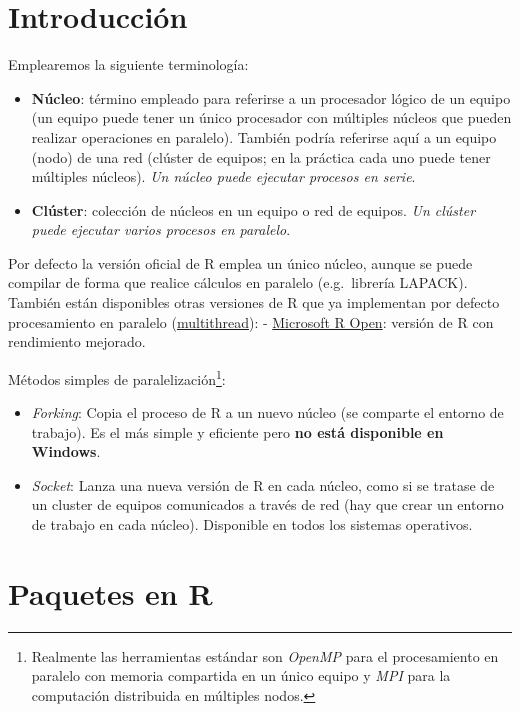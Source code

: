\documentclass[
  10pt,
]{book}
\theoremstyle{break}
\theoremstyle{nonumberplain}
\let\oldfootnote\footnote
\renewcommand\footnote[1]{\oldfootnote{\hspace{2mm}#1}}
\begin{document}
\hypertarget{introducciuxf3n}{%
\section{Introducción}\label{introducciuxf3n}}

Emplearemos la siguiente terminología:

\begin{itemize}
\item
  \textbf{Núcleo}: término empleado para referirse a un procesador lógico de un equipo (un equipo puede tener un único procesador con múltiples núcleos que pueden realizar operaciones en paralelo).
  También podría referirse aquí a un equipo (nodo) de una red (clúster de equipos; en la práctica cada uno puede tener múltiples núcleos). \emph{Un núcleo puede ejecutar procesos en serie}.
\item
  \textbf{Clúster}: colección de núcleos en un equipo o red de equipos.
  \emph{Un clúster puede ejecutar varios procesos en paralelo}.
\end{itemize}

Por defecto la versión oficial de R emplea un único núcleo, aunque se puede compilar de forma que realice cálculos en paralelo (e.g.~librería LAPACK).
También están disponibles otras versiones de R que ya implementan por defecto procesamiento en paralelo (\href{https://mran.revolutionanalytics.com/documents/rro/multithread}{multithread}):
- \href{https://mran.revolutionanalytics.com}{Microsoft R Open}: versión de R con rendimiento mejorado.

Métodos simples de paralelización\footnote{Realmente las herramientas estándar son \emph{OpenMP} para el procesamiento en paralelo con memoria compartida en un único equipo y \emph{MPI} para la computación distribuida en múltiples nodos.}:

\begin{itemize}
\item
  \emph{Forking}: Copia el proceso de R a un nuevo núcleo (se comparte el entorno de trabajo).
  Es el más simple y eficiente pero \textbf{no está disponible en Windows}.
\item
  \emph{Socket}: Lanza una nueva versión de R en cada núcleo, como si se tratase de un cluster de equipos comunicados a través de red (hay que crear un entorno de trabajo en cada núcleo).
  Disponible en todos los sistemas operativos.
\end{itemize}

\hypertarget{paquetes-en-r}{%
\section{Paquetes en R}\label{paquetes-en-r}}
\end{document}
